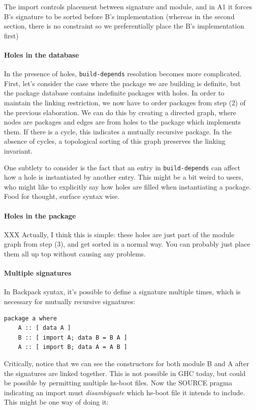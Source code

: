 \documentclass{article}
\begin{document}
The import controls placement between signature and module, and in A1 it
forces B's signature to be sorted before B's implementation (whereas in
the second section, there is no constraint so we preferentially place
the B's implementation first)

\paragraph{Holes in the database} In the presence of holes,
\verb|build-depends| resolution becomes more complicated.  First,
let's consider the case where the package we are building is
definite, but the package database contains indefinite packages with holes.
In order to maintain the linking restriction, we now have to order packages
from step (2) of the previous elaboration.  We can do this by creating
a directed graph, where nodes are packages and edges are from holes to the
package which implements them.  If there is a cycle, this indicates a mutually
recursive package.  In the absence of cycles, a topological sorting of this
graph preserves the linking invariant.

One subtlety to consider is the fact that an entry in \verb|build-depends|
can affect how a hole is instantiated by another entry.  This might be a
bit weird to users, who might like to explicitly say how holes are
filled when instantiating a package.  Food for thought, surface syntax wise.

\paragraph{Holes in the package} XXX Actually, I think this is simple:
these holes are just part of the module graph from step (3), and get
sorted in a normal way.  You can probably just place them all up top without
causing any problems.

\paragraph{Multiple signatures}  In Backpack syntax, it's possible to
define a signature multiple times, which is necessary for mutually
recursive signatures:

\begin{verbatim}
package a where
    A :: [ data A ]
    B :: [ import A; data B = B A ]
    A :: [ import B; data A = A B ]
\end{verbatim}

Critically, notice that we can see the constructors for both module B and A
after the signatures are linked together.  This is not possible in GHC
today, but could be possible by permitting multiple hs-boot files.  Now
the SOURCE pragma indicating an import must \emph{disambiguate} which
hs-boot file it intends to include.  This might be one way of doing it:
\end{document}
